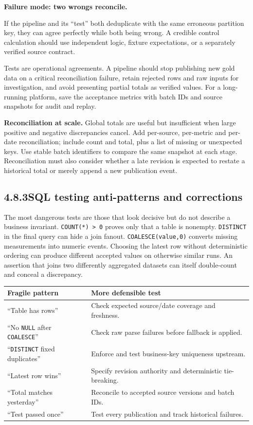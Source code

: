\documentclass[11pt,twoside]{article}
\newcommand{\topic}[2]{\subsection*{#1\quad #2}}
\begin{document}
\begin{insight}\textbf{Failure mode: two wrongs reconcile.}\par
If the pipeline and its ``test'' both deduplicate with the same erroneous partition key, they can agree perfectly while both being wrong. A credible control calculation should use independent logic, fixture expectations, or a separately verified source contract.\end{insight}

Tests are operational agreements. A pipeline should stop publishing new gold data on a critical reconciliation failure, retain rejected rows and raw inputs for investigation, and avoid presenting partial totals as verified values. For a long-running platform, save the acceptance metrics with batch IDs and source snapshots for audit and replay.


\textbf{Reconciliation at scale.} Global totals are useful but insufficient when large positive and negative discrepancies cancel. Add per-source, per-metric and per-date reconciliation; include count and total, plus a list of missing or unexpected keys. Use stable batch identifiers to compare the same snapshot at each stage. Reconciliation must also consider whether a late revision is expected to restate a historical total or merely append a new publication event.

\newpage
\topic{4.8.3}{SQL testing anti-patterns and corrections}
The most dangerous tests are those that look decisive but do not describe a business invariant. \texttt{COUNT(*) > 0} proves only that a table is nonempty. \texttt{DISTINCT} in the final query can hide a join fanout. \texttt{COALESCE(value,0)} converts missing measurements into numeric events. Choosing the latest row without deterministic ordering can produce different accepted values on otherwise similar runs. An assertion that joins two differently aggregated datasets can itself double-count and conceal a discrepancy.

\begin{center}
\small\begin{tabularx}{\linewidth}{@{}p{40mm}X@{}}\toprule
Fragile pattern & More defensible test\\\midrule
``Table has rows'' & Check expected source/date coverage and freshness.\\
``No \texttt{NULL} after \texttt{COALESCE}'' & Check raw parse failures before fallback is applied.\\
``\texttt{DISTINCT} fixed duplicates'' & Enforce and test business-key uniqueness upstream.\\
``Latest row wins'' & Specify revision authority and deterministic tie-breaking.\\
``Total matches yesterday'' & Reconcile to accepted source versions and batch IDs.\\
``Test passed once'' & Test every publication and track historical failures.\\\bottomrule
\end{tabularx}
\end{center}
\end{document}
